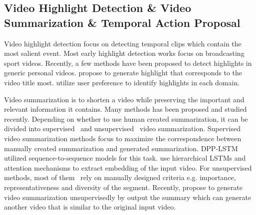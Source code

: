 \documentclass[10pt,journal,compsoc]{IEEEtran}
\begin{document}
\subsection{Video Highlight Detection \& Video Summarization \& Temporal Action Proposal}


Video highlight detection focus on detecting temporal clips which contain the most salient event. Most early highlight detection works focus on
broadcasting sport videos. Recently, a few methods have
been proposed to detect highlights in generic personal videos. \cite{zeng2016generation} propose to generate highlight that corresponds to the video title most. \cite{song2015tvsum} utilize user preference to identify highlights in each domain.

Video summarization is to shorten a video while preserving the important and relevant information it contains. Many methods has been proposed and studied recently. Depending on whether to use human created summarization, it can be divided into supervised~\cite{zhang2016video,zhou2017deep, ji2017video, zhao2017hierarchical} and unsupervised~\cite{mahasseni2017unsupervised, zhang2018retrospective,yang2015unsupervised, kang2006space} video summarization. Supervised video summarization methods focus to maximize the correspondence between manually created summarization and generated summarization. DPP-LSTM~\cite{zhang2016video} utilized sequence-to-sequence models for this task. \cite{ji2017video, zhao2017hierarchical, zhang2018retrospective} use hierarchical LSTMs and attention mechanisms to extract embedding of the input video. For unsupervised methods, most of them~\cite{kang2006space, chu2015video, lee2012discovering} rely on manually designed criteria e.g. importance, representativeness and diversity of the segment. Recently, \cite{zhang2018retrospective, yang2015unsupervised, mahasseni2017unsupervised} propose to generate video summarization unsupervisedly by output the summary which can generate another video that is similar to the original input video.   
\end{document}
